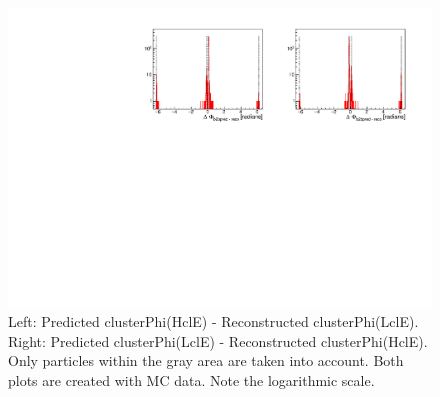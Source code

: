 \documentclass[a4paper,11pt,twosided,final,german,openbib,pdftex,listof=totoc,bibliography=totoc]{scrbook}
\begin{document}
\begin{appendix}
\begin{figure}[!htbp]
	\centering
	\includegraphics[width=\textwidth]{Plots/sb2b_MC_0.pdf}
	\caption[b2bClusterPhi - clusterPhi For MC (Whole Range)]{Left: Predicted clusterPhi(HclE) - Reconstructed clusterPhi(LclE). Right: Predicted clusterPhi(LclE) - Reconstructed clusterPhi(HclE). Only particles within the gray area are taken into account. Both plots are created with MC data. Note the logarithmic scale.}
	\label{fig:b2bMC_Whole}
\end{figure}
\newpage







\end{appendix}
\end{document}
